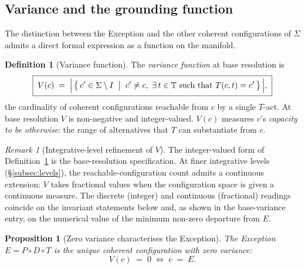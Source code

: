 \documentclass[11pt,a4paper]{article}
\newtheorem{proposition}[theorem]{Proposition}
\theoremstyle{definition}
\newtheorem{definition}[theorem]{Definition}
\theoremstyle{remark}
\newtheorem{remark}[theorem]{Remark}
\newcommand{\PDT}{\ensuremath{P{\circ}D{\circ}T}}
\begin{document}
\subsection{Variance and the grounding function}\label{subsec:variance}

The distinction between the Exception and the other coherent configurations of $\Sigma$ admits a direct formal expression as a function on the manifold.

\begin{definition}[Variance function]\label{def:variance}
The \emph{variance function} at base resolution is
\[
\boxed{\;V(c) \;=\; \Bigl|\,\bigl\{\,c' \in \Sigma \setminus I \;\bigm|\; c' \ne c,\ \exists\,t \in \mathbb{T} \text{ such that } T(c,t) = c'\,\bigr\}\,\Bigr|,\;}
\]
the cardinality of coherent configurations reachable from $c$ by a single $T$-act. At base resolution $V$ is non-negative and integer-valued. $V(c)$ measures $c$'s \emph{capacity to be otherwise}: the range of alternatives that $T$ can substantiate from $c$.
\end{definition}

\begin{remark}[Integrative-level refinement of $V$]\label{rem:V-levels}
The integer-valued form of Definition~\ref{def:variance} is the base-resolution specification. At finer integrative levels (\S\ref{subsec:levels}), the reachable-configuration count admits a continuous extension: $V$ takes fractional values when the configuration space is given a continuous measure. The discrete (integer) and continuous (fractional) readings coincide on the invariant statements below and, as shown in the base-variance entry, on the numerical value of the minimum non-zero departure from $E$.
\end{remark}

\begin{proposition}[Zero variance characterises the Exception]\label{prop:zero-variance}
The Exception $E = \PDT$ is the unique coherent configuration with zero variance:
\[
V(c) \;=\; 0 \;\iff\; c \;=\; E.
\]
\end{proposition}
\end{document}
